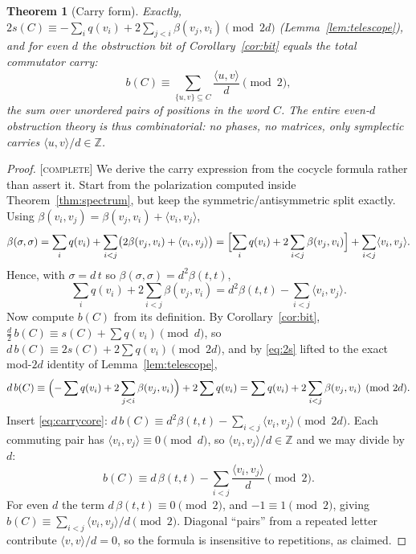 \documentclass[11pt]{article}
\newtheorem{theorem}{Theorem}
\theoremstyle{definition}
\theoremstyle{remark}
\newcommand{\Z}{\mathbb{Z}}
\newcommand{\ip}[2]{\langle #1,#2\rangle}
\newcommand{\CO}{\textnormal{\textsc{[complete]}}}
\begin{document}
\begin{theorem}[Carry form]\label{thm:carry}
Exactly, $2s(C)\equiv-\sum_iq(v_i)+2\sum_{j<i}\beta(v_j,v_i)\pmod{2d}$
(Lemma~\ref{lem:telescope}), and for even $d$ the obstruction bit of
Corollary~\ref{cor:bit} equals the total commutator carry:
\[
b(C)\equiv\sum_{\{u,v\}\subseteq C}\frac{\ip{u}{v}}{d}\pmod2,
\]
the sum over unordered pairs of positions in the word $C$. The entire even-$d$ obstruction theory is
thus combinatorial: no phases, no matrices, only symplectic carries $\ip{u}{v}/d\in\Z$.
\end{theorem}
\begin{proof}
\CO{} We derive the carry expression from the cocycle formula rather than assert it. Start from the
polarization computed inside Theorem~\ref{thm:spectrum}, but keep the symmetric/antisymmetric split
exactly. Using $\beta(v_i,v_j)=\beta(v_j,v_i)+\ip{v_i}{v_j}$,
\[
\beta(\sigma,\sigma)=\sum_iq(v_i)+\sum_{i<j}\bigl(2\beta(v_j,v_i)+\ip{v_i}{v_j}\bigr)
=\Bigl[\sum_iq(v_i)+2\sum_{i<j}\beta(v_j,v_i)\Bigr]+\sum_{i<j}\ip{v_i}{v_j}.
\]
Hence, with $\sigma=d\,t$ so $\beta(\sigma,\sigma)=d^2\beta(t,t)$,
\begin{equation}\label{eq:carrycore}
\sum_iq(v_i)+2\sum_{i<j}\beta(v_j,v_i)=d^2\beta(t,t)-\sum_{i<j}\ip{v_i}{v_j}.
\end{equation}
Now compute $b(C)$ from its definition. By Corollary~\ref{cor:bit},
$\tfrac d2\,b(C)\equiv s(C)+\sum q(v_i)\pmod d$, so
$d\,b(C)\equiv2s(C)+2\sum q(v_i)\pmod{2d}$, and by \eqref{eq:2s} lifted to the exact mod-$2d$
identity of Lemma~\ref{lem:telescope},
\[
d\,b(C)\equiv\Bigl(-\sum q(v_i)+2\sum_{j<i}\beta(v_j,v_i)\Bigr)+2\sum q(v_i)
=\sum q(v_i)+2\sum_{i<j}\beta(v_j,v_i)\pmod{2d}.
\]
Insert \eqref{eq:carrycore}: $d\,b(C)\equiv d^2\beta(t,t)-\sum_{i<j}\ip{v_i}{v_j}\pmod{2d}$. Each
commuting pair has $\ip{v_i}{v_j}\equiv0\pmod d$, so $\ip{v_i}{v_j}/d\in\Z$ and we may divide by $d$:
\[
b(C)\equiv d\,\beta(t,t)-\sum_{i<j}\frac{\ip{v_i}{v_j}}{d}\pmod2 .
\]
For even $d$ the term $d\,\beta(t,t)\equiv0\pmod2$, and $-1\equiv1\pmod2$, giving
$b(C)\equiv\sum_{i<j}\ip{v_i}{v_j}/d\pmod2$. Diagonal ``pairs'' from a repeated letter contribute
$\ip{v}{v}/d=0$, so the formula is insensitive to repetitions, as claimed.
\end{proof}
\end{document}
